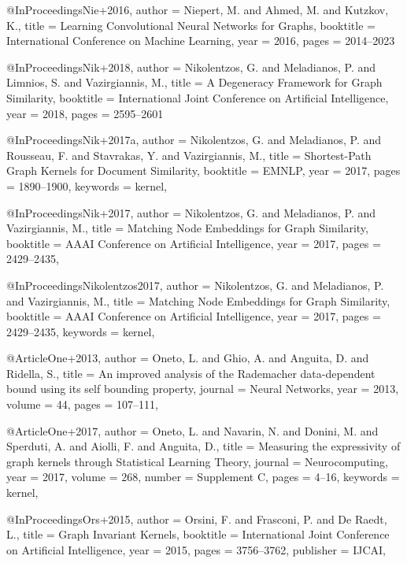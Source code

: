@InProceedings{Nie+2016,
  author    = {Niepert, M. and Ahmed, M. and Kutzkov, K.},
  title     = {Learning Convolutional Neural Networks for Graphs},
  booktitle = {International Conference on Machine Learning},
  year      = {2016},
  pages     = {2014--2023}
}

@InProceedings{Nik+2018,
  author    = {Nikolentzos, G. and Meladianos, P. and Limnios, S. and Vazirgiannis, M.},
  title     = {A Degeneracy Framework for Graph Similarity},
  booktitle = {International Joint Conference on Artificial Intelligence},
  year      = {2018},
  pages     = {2595--2601}
}

@InProceedings{Nik+2017a,
  author    = {Nikolentzos, G. and Meladianos, P. and Rousseau, F. and Stavrakas, Y. and Vazirgiannis, M.},
  title     = {Shortest-Path Graph Kernels for Document Similarity},
  booktitle = {EMNLP},
  year      = {2017},
  pages     = {1890--1900},
  keywords  = {kernel},
}

@InProceedings{Nik+2017,
  author    = {Nikolentzos, G. and Meladianos, P. and Vazirgiannis, M.},
  title     = {Matching Node Embeddings for Graph Similarity},
  booktitle = {AAAI Conference on Artificial Intelligence},
  year      = {2017},
  pages     = {2429--2435},
}

@InProceedings{Nikolentzos2017,
  author    = {Nikolentzos, G. and Meladianos, P. and Vazirgiannis, M.},
  title     = {Matching Node Embeddings for Graph Similarity},
  booktitle = {AAAI Conference on Artificial Intelligence},
  year      = {2017},
  pages     = {2429--2435},
  keywords  = {kernel},
}

@Article{One+2013,
  author  = {Oneto, L. and Ghio, A. and Anguita, D. and Ridella, S.},
  title   = {An improved analysis of the Rademacher data-dependent bound using its self bounding property},
  journal = {Neural Networks},
  year    = {2013},
  volume  = {44},
  pages   = {107--111},
}

@Article{One+2017,
  author   = {Oneto, L. and Navarin, N. and Donini, M. and Sperduti, A. and Aiolli, F. and Anguita, D.},
  title    = {Measuring the expressivity of graph kernels through Statistical Learning Theory},
  journal  = {Neurocomputing},
  year     = {2017},
  volume   = {268},
  number   = {Supplement C},
  pages    = {4--16},
  keywords = {kernel},
}

@InProceedings{Ors+2015,
  author    = {Orsini, F. and Frasconi, P. and De Raedt, L.},
  title     = {Graph Invariant Kernels},
  booktitle = {International Joint Conference on Artificial Intelligence},
  year      = {2015},
  pages     = {3756--3762},
  publisher = {IJCAI},
}

